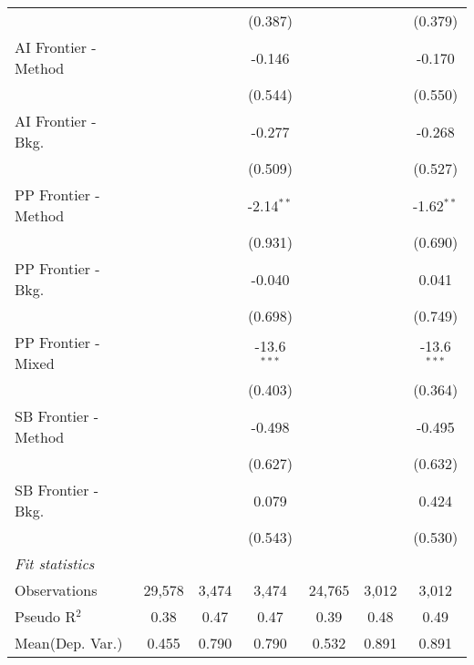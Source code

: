 \begin{tabular}{lcccccc}
                        &               &         & (0.387)       &               &         & (0.379)\\   
   AI Frontier - Method &               &         & -0.146        &               &         & -0.170\\   
                        &               &         & (0.544)       &               &         & (0.550)\\   
   AI Frontier - Bkg.   &               &         & -0.277        &               &         & -0.268\\   
                        &               &         & (0.509)       &               &         & (0.527)\\   
   PP Frontier - Method &               &         & -2.14$^{**}$  &               &         & -1.62$^{**}$\\   
                        &               &         & (0.931)       &               &         & (0.690)\\   
   PP Frontier - Bkg.   &               &         & -0.040        &               &         & 0.041\\   
                        &               &         & (0.698)       &               &         & (0.749)\\   
   PP Frontier - Mixed  &               &         & -13.6$^{***}$ &               &         & -13.6$^{***}$\\   
                        &               &         & (0.403)       &               &         & (0.364)\\   
   SB Frontier - Method &               &         & -0.498        &               &         & -0.495\\   
                        &               &         & (0.627)       &               &         & (0.632)\\   
   SB Frontier - Bkg.   &               &         & 0.079         &               &         & 0.424\\   
                        &               &         & (0.543)       &               &         & (0.530)\\   
   \midrule
   \emph{Fit statistics}\\
   Observations         & 29,578        & 3,474   & 3,474         & 24,765        & 3,012   & 3,012\\  
   Pseudo R$^2$         & 0.38          & 0.47    & 0.47          & 0.39          & 0.48    & 0.49\\  
Mean(Dep. Var.) & 0.455 & 0.790 & 0.790 & 0.532 & 0.891 & 0.891 \\
   

\end{tabular}
